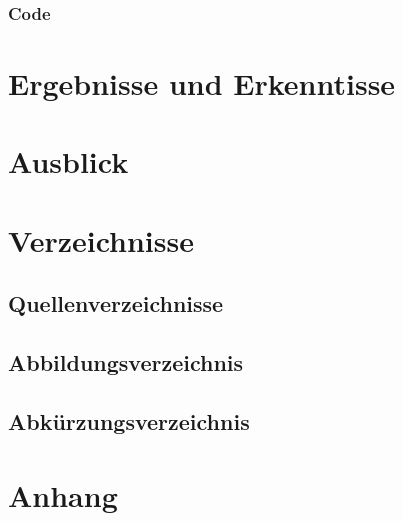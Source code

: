 \documentclass[titlepage,12pt,twoside]{article}
\begin{document}
\subsubsection{Code}

\section{Ergebnisse und Erkenntisse}

\section{Ausblick}

\section{Verzeichnisse}
\subsection{Quellenverzeichnisse}

\subsection{Abbildungsverzeichnis}
\subsection{Abkürzungsverzeichnis}

\section{Anhang}


\end{document}
